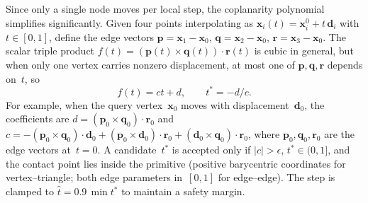 \documentclass[acmtog,anonymous,review]{acmart}
\begin{document}
Since only a single node moves per local step, the coplanarity
polynomial simplifies significantly.  Given four points interpolating
as $\mathbf{x}_i(t)=\mathbf{x}_i^0+t\,\mathbf{d}_i$ with
$t\in[0,1]$, define the edge vectors
$\mathbf{p}=\mathbf{x}_1-\mathbf{x}_0$,
$\mathbf{q}=\mathbf{x}_2-\mathbf{x}_0$,
$\mathbf{r}=\mathbf{x}_3-\mathbf{x}_0$.  The scalar triple product
$f(t)=(\mathbf{p}(t)\times\mathbf{q}(t))\cdot\mathbf{r}(t)$ is
cubic in general, but when only one vertex carries nonzero
displacement, at most one of $\mathbf{p},\mathbf{q},\mathbf{r}$
depends on~$t$, so
\begin{equation}\label{eq:linear_ccd}
  f(t) = ct + d, \qquad t^* = -d/c.
\end{equation}
For example, when the query vertex~$\mathbf{x}_0$ moves with
displacement~$\mathbf{d}_0$, the coefficients are
$d=(\mathbf{p}_0\!\times\!\mathbf{q}_0)\cdot\mathbf{r}_0$ and
$c=-(\mathbf{p}_0\!\times\!\mathbf{q}_0)\cdot\mathbf{d}_0
   +(\mathbf{p}_0\!\times\!\mathbf{d}_0)\cdot\mathbf{r}_0
   +(\mathbf{d}_0\!\times\!\mathbf{q}_0)\cdot\mathbf{r}_0$,
where $\mathbf{p}_0,\mathbf{q}_0,\mathbf{r}_0$ are the edge vectors
at~$t\!=\!0$.  A candidate~$t^*$ is accepted only if $|c|>\epsilon$,
$t^*\!\in\!(0,1]$, and the contact point lies inside the primitive
(positive barycentric coordinates for vertex--triangle; both edge
parameters in~$[0,1]$ for edge--edge).  The step is clamped to
$\hat{t}=0.9\,\min t^*$ to maintain a safety margin.



\end{document}
